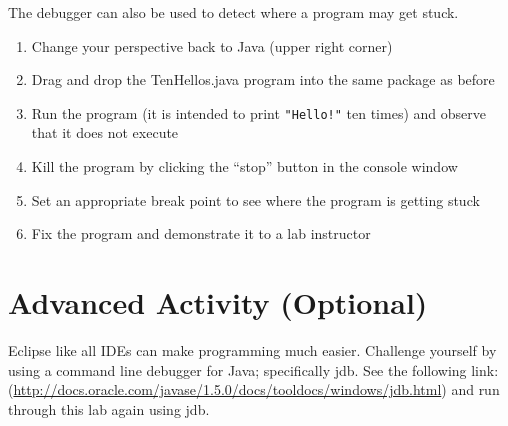 \documentclass[12pt]{scrartcl}
\begin{document}
The debugger can also be used to detect where a program may get stuck.  
\begin{enumerate}
  \item Change your perspective back to Java (upper right corner)
  \item Drag and drop the TenHellos.java program into the same package as before
  \item Run the program (it is intended to print \texttt{"Hello!"} ten times) 
	and observe that it does not execute
  \item Kill the program by clicking the ``stop'' button in the console window
  \item Set an appropriate break point to see where the program is getting stuck
  \item Fix the program and demonstrate it to a lab instructor
\end{enumerate}

\section{Advanced Activity (Optional)}

Eclipse like all IDEs can make programming much easier.  Challenge yourself 
by using a command line debugger for Java; specifically jdb.  See the following 
link: (\url{http://docs.oracle.com/javase/1.5.0/docs/tooldocs/windows/jdb.html}) 
and run through this lab again using jdb.
\end{document}
